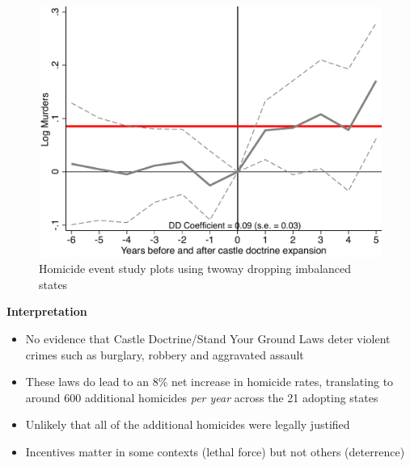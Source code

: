 \documentclass[notes=show]{beamer}
\begin{document}
\begin{frame}[plain]

	\begin{figure}
	\includegraphics[scale=0.5]{./lecture_includes/event_cheng4.pdf}
	\caption{Homicide event study plots using twoway dropping imbalanced states}
	\end{figure}

\end{frame}

\begin{frame}[plain]
	\begin{center}
	\textbf{Interpretation}
	\end{center}
	
	\begin{itemize}
	\item No evidence that Castle Doctrine/Stand Your Ground Laws deter violent crimes such as burglary, robbery and aggravated assault
	\item These laws do lead to an 8\% net increase in homicide rates, translating to around 600 additional homicides \emph{per year} across the 21 adopting states
	\item Unlikely that all of the additional homicides were legally justified
	\item Incentives matter in some contexts (lethal force) but not others (deterrence)
	\end{itemize}
\end{frame}
\end{document}
